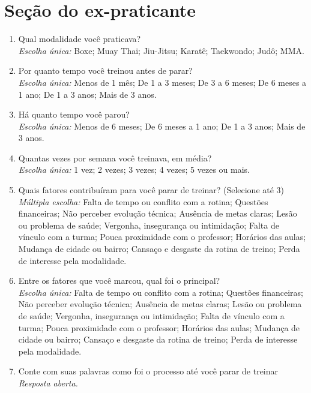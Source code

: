 \section*{Seção do ex-praticante}
\begin{enumerate}[leftmargin=*, itemsep=1pt, parsep=0pt]
  \item Qual modalidade você praticava?\\
        {\footnotesize\textit{Escolha única:} Boxe; Muay Thai; Jiu-Jitsu; Karatê; Taekwondo; Judô; MMA.}
  \item Por quanto tempo você treinou antes de parar?\\
        {\footnotesize\textit{Escolha única:} Menos de 1 mês; De 1 a 3 meses; De 3 a 6 meses; De 6 meses a 1 ano; De 1 a 3 anos; Mais de 3 anos.}
  \item Há quanto tempo você parou?\\
        {\footnotesize\textit{Escolha única:} Menos de 6 meses; De 6 meses a 1 ano; De 1 a 3 anos; Mais de 3 anos.}
  \item Quantas vezes por semana você treinava, em média?\\
        {\footnotesize\textit{Escolha única:} 1 vez; 2 vezes; 3 vezes; 4 vezes; 5 vezes ou mais.}
  \item Quais fatores contribuíram para você parar de treinar? (Selecione até 3)\\
        {\footnotesize\textit{Múltipla escolha:} Falta de tempo ou conflito com a rotina; Questões financeiras; Não perceber evolução técnica; Ausência de metas claras; Lesão ou problema de saúde; Vergonha, insegurança ou intimidação; Falta de vínculo com a turma; Pouca proximidade com o professor; Horários das aulas; Mudança de cidade ou bairro; Cansaço e desgaste da rotina de treino; Perda de interesse pela modalidade.}
  \item Entre os fatores que você marcou, qual foi o principal?\\
        {\footnotesize\textit{Escolha única:} Falta de tempo ou conflito com a rotina; Questões financeiras; Não perceber evolução técnica; Ausência de metas claras; Lesão ou problema de saúde; Vergonha, insegurança ou intimidação; Falta de vínculo com a turma; Pouca proximidade com o professor; Horários das aulas; Mudança de cidade ou bairro; Cansaço e desgaste da rotina de treino; Perda de interesse pela modalidade.}
  \item Conte com suas palavras como foi o processo até você parar de treinar\\
        {\footnotesize\textit{Resposta aberta.}}

\end{enumerate}
